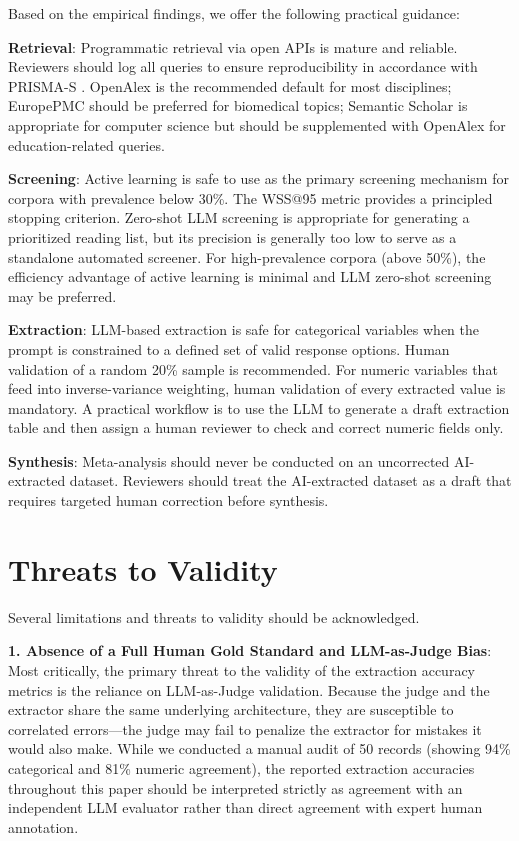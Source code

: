\documentclass[12pt]{article}
\begin{document}
Based on the empirical findings, we offer the following practical guidance:

\textbf{Retrieval}: Programmatic retrieval via open APIs is mature and reliable. Reviewers should log all queries to ensure reproducibility in accordance with PRISMA-S \citep{rethlefsen2021prismas}. OpenAlex is the recommended default for most disciplines; EuropePMC should be preferred for biomedical topics; Semantic Scholar is appropriate for computer science but should be supplemented with OpenAlex for education-related queries.

\textbf{Screening}: Active learning is safe to use as the primary screening mechanism for corpora with prevalence below 30\%. The WSS@95 metric provides a principled stopping criterion. Zero-shot LLM screening is appropriate for generating a prioritized reading list, but its precision is generally too low to serve as a standalone automated screener. For high-prevalence corpora (above 50\%), the efficiency advantage of active learning is minimal and LLM zero-shot screening may be preferred.

\textbf{Extraction}: LLM-based extraction is safe for categorical variables when the prompt is constrained to a defined set of valid response options. Human validation of a random 20\% sample is recommended. For numeric variables that feed into inverse-variance weighting, human validation of every extracted value is mandatory. A practical workflow is to use the LLM to generate a draft extraction table and then assign a human reviewer to check and correct numeric fields only.

\textbf{Synthesis}: Meta-analysis should never be conducted on an uncorrected AI-extracted dataset. Reviewers should treat the AI-extracted dataset as a draft that requires targeted human correction before synthesis.

\section{Threats to Validity}

Several limitations and threats to validity should be acknowledged.

\textbf{1. Absence of a Full Human Gold Standard and LLM-as-Judge Bias}: Most critically, the primary threat to the validity of the extraction accuracy metrics is the reliance on LLM-as-Judge validation. Because the judge and the extractor share the same underlying architecture, they are susceptible to correlated errors---the judge may fail to penalize the extractor for mistakes it would also make. While we conducted a manual audit of 50 records (showing 94\% categorical and 81\% numeric agreement), the reported extraction accuracies throughout this paper should be interpreted strictly as agreement with an independent LLM evaluator rather than direct agreement with expert human annotation.
\end{document}
